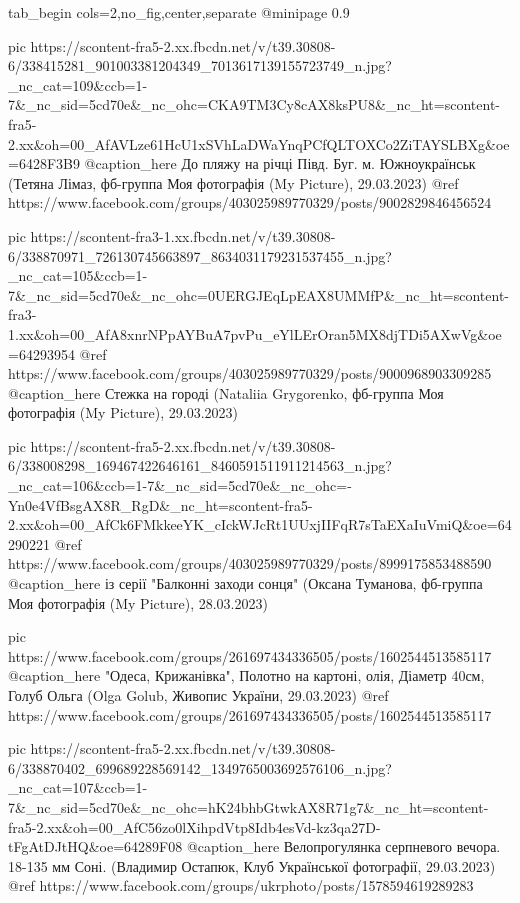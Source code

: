  
 
 
 
 



\ifcmt
  tab_begin cols=2,no_fig,center,separate
     @minipage 0.9

     pic https://scontent-fra5-2.xx.fbcdn.net/v/t39.30808-6/338415281_901003381204349_7013617139155723749_n.jpg?_nc_cat=109&ccb=1-7&_nc_sid=5cd70e&_nc_ohc=CKA9TM3Cy8cAX8ksPU8&_nc_ht=scontent-fra5-2.xx&oh=00_AfAVLze61HcU1xSVhLaDWaYnqPCfQLTOXCo2ZiTAYSLBXg&oe=6428F3B9
     @caption_here До пляжу на річці Півд. Буг. м. Южноукраїнськ (Тетяна Лімаз, фб-группа Моя фотографія (My Picture), 29.03.2023)
     @ref https://www.facebook.com/groups/403025989770329/posts/9002829846456524

     pic https://scontent-fra3-1.xx.fbcdn.net/v/t39.30808-6/338870971_726130745663897_8634031179231537455_n.jpg?_nc_cat=105&ccb=1-7&_nc_sid=5cd70e&_nc_ohc=0UERGJEqLpEAX8UMMfP&_nc_ht=scontent-fra3-1.xx&oh=00_AfA8xnrNPpAYBuA7pvPu_eYlLErOran5MX8djTDi5AXwVg&oe=64293954
     @ref https://www.facebook.com/groups/403025989770329/posts/9000968903309285
     @caption_here Стежка на городі (Nataliia Grygorenko, фб-группа Моя фотографія (My Picture), 29.03.2023)

     pic https://scontent-fra5-2.xx.fbcdn.net/v/t39.30808-6/338008298_169467422646161_8460591511911214563_n.jpg?_nc_cat=106&ccb=1-7&_nc_sid=5cd70e&_nc_ohc=-Yn0e4VfBsgAX8R_RgD&_nc_ht=scontent-fra5-2.xx&oh=00_AfCk6FMkkeeYK_cIckWJcRt1UUxjIIFqR7sTaEXaIuVmiQ&oe=64290221
     @ref https://www.facebook.com/groups/403025989770329/posts/8999175853488590
     @caption_here із серії "Балконні заходи сонця" (Оксана Туманова, фб-группа Моя фотографія (My Picture), 28.03.2023)

     pic https://www.facebook.com/groups/261697434336505/posts/1602544513585117
     @caption_here "Одеса, Крижанівка", Полотно на картоні, олія, Діаметр 40см, Голуб Ольга (Olga Golub, Живопис України, 29.03.2023)
     @ref https://www.facebook.com/groups/261697434336505/posts/1602544513585117

     pic https://scontent-fra5-2.xx.fbcdn.net/v/t39.30808-6/338870402_699689228569142_1349765003692576106_n.jpg?_nc_cat=107&ccb=1-7&_nc_sid=5cd70e&_nc_ohc=hK24bhbGtwkAX8R71g7&_nc_ht=scontent-fra5-2.xx&oh=00_AfC56zo0lXihpdVtp8Idb4esVd-kz3qa27D-tFgAtDJtHQ&oe=64289F08
     @caption_here Велопрогулянка серпневого вечора. 18-135 мм Соні. (Владимир Остапюк, Клуб Української фотографії, 29.03.2023)
     @ref https://www.facebook.com/groups/ukrphoto/posts/1578594619289283

